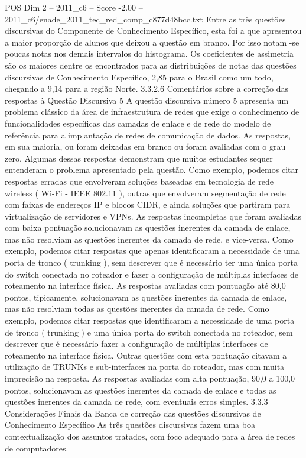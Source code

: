 \begin{textsample}{POS Dim 2 – 2011\_c6 – Score -2.00 – 2011\_c6/enade\_2011\_tec\_red\_comp\_c877d48bcc.txt}
Entre as três questões discursivas do Componente de Conhecimento Específico, esta foi a que apresentou a maior proporção de alunos que deixou a questão em branco.
Por isso notam -se poucas notas nos demais intervalos do histograma.
Os coeficientes de assimetria são os maiores dentre os encontrados para as distribuições de notas das questões discursivas de Conhecimento Específico, 2,85 para o Brasil como um todo, chegando a 9,14 para a região Norte. 3.3.2.6 Comentários sobre a correção das respostas à Questão Discursiva 5 A questão discursiva número 5 apresenta um problema clássico da área de infraestrutura de redes que exige o conhecimento de funcionalidades específicas das camadas de enlace e de rede do modelo de referência para a implantação de redes de comunicação de dados.
As respostas, em sua maioria, ou foram deixadas em branco ou foram avaliadas com o grau zero.
Algumas dessas respostas demonstram que muitos estudantes sequer entenderam o problema apresentado pela questão.
Como exemplo, podemos citar respostas erradas que envolveram soluções baseadas em tecnologia de rede wireless ( Wi-Fi - IEEE 802.11 ), outras que envolveram segmentação de rede com faixas de endereços IP e blocos CIDR, e ainda soluções que partiram para virtualização de servidores e VPNs.
As respostas incompletas que foram avaliadas com baixa pontuação solucionavam as questões inerentes da camada de enlace, mas não resolviam as questões inerentes da camada de rede, e vice-versa.
Como exemplo, podemos citar respostas que apenas identificaram a necessidade de uma porta de tronco ( trunking ), sem descrever que é necessário ter uma única porta do switch conectada no roteador e fazer a configuração de múltiplas interfaces de roteamento na interface física.
As respostas avaliadas com pontuação até 80,0 pontos, tipicamente, solucionavam as questões inerentes da camada de enlace, mas não resolviam todas as questões inerentes da camada de rede.
Como exemplo, podemos citar respostas que identificaram a necessidade de uma porta de tronco ( trunking ) e uma única porta do switch conectada no roteador, sem descrever que é necessário fazer a configuração de múltiplas interfaces de roteamento na interface física.
Outras questões com esta pontuação citavam a utilização de TRUNKs e sub-interfaces na porta do roteador, mas com muita imprecisão na resposta.
As respostas avaliadas com alta pontuação, 90,0 a 100,0 pontos, solucionavam as questões inerentes da camada de enlace e todas as questões inerentes da camada de rede, com eventuais erros simples. 3.3.3 Considerações Finais da Banca de correção das questões discursivas de Conhecimento Específico As três questões discursivas fazem uma boa contextualização dos assuntos tratados, com foco adequado para a área de redes de computadores.

\end{textsample}
